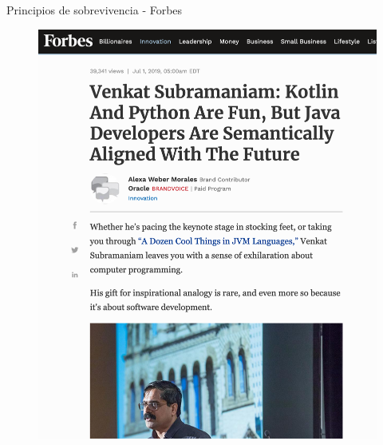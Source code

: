 \documentclass[aspectratio=169]{beamer}
\begin{document}
\begin{frame}{Principios de sobrevivencia - Forbes}
    \begin{figure}
        \centering
        \includegraphics[width=0.5\linewidth]{Images/venkat}
    \end{figure}
\end{frame}
\end{document}
